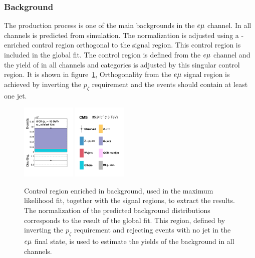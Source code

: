 \subsubsection{\ttbar Background}
The \ttbar production process is one of the main backgrounds in the $e\mu$ channel.
In all channels \ttbar is predicted from simulation. The normalization is adjusted using
a \ttbar-enriched control region orthogonal to the signal region. This control region is included
in the global fit. The control region is defined from the $e\mu$ channel and the yield
of \ttbar in all channels and categories is adjusted by this singular \ttbar control region.
It is shown in figure~\ref{fig:htt_ttbar_CR2},
Orthogonality from the $e\mu$ signal region is achieved by inverting the $p_\zeta$ requirement
and the events should contain at least one jet.

\begin{figure}[htb]
\centering
     \includegraphics[width=0.23\textwidth]{higgs_to_taus/plots/Figure_005-a.pdf}
     \includegraphics[width=0.23\textwidth]{higgs_to_taus/plots/Figure_005-b.pdf}
     \caption{Control region enriched in \ttbar background, used in the maximum likelihood fit, 
together with the signal regions, to extract the results. The normalization of the predicted background 
distributions corresponds to the result of the global fit. This region, defined by inverting the 
$p_\zeta$ requirement and rejecting events with no jet in the $e\mu$ final state, is used to estimate the
yields of the \ttbar background in all channels.}
     \label{fig:htt_ttbar_CR2}
\end{figure}

